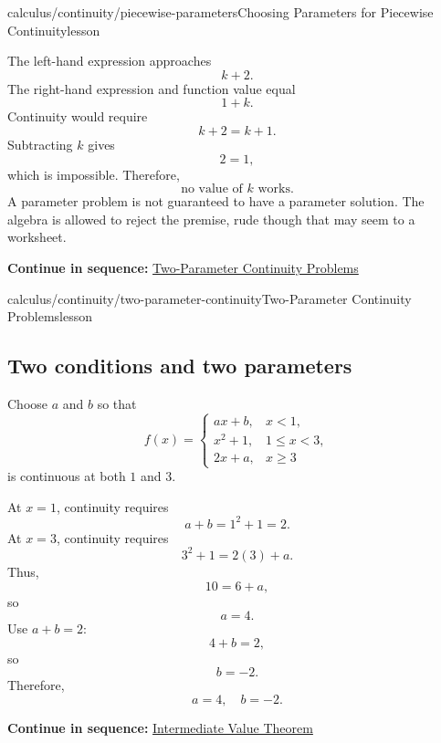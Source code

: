 \documentclass[11pt,openany]{book}
\theoremstyle{bgplain}
\newcounter{bgexample}[chapter]
\newcommand{\webnext}[2]{%
  \par\addvspace{1.2em}\noindent{\color{BGLine}\rule{\textwidth}{0.35pt}}\par\smallskip
  {\small\color{BGGray}\textbf{Continue in sequence:} \hyperlink{web:#1}{#2}}\par
}
\begin{document}
\begin{webpage}{calculus/continuity/piecewise-parameters}{Choosing Parameters for Piecewise Continuity}{lesson}
\begin{bgexample}[title={Exam-level: no parameter works}]
\begin{bgsolution}
The left-hand expression approaches
\[
  k+2.
\]
The right-hand expression and function value equal
\[
  1+k.
\]
Continuity would require
\[
  k+2=k+1.
\]
Subtracting \(k\) gives
\[
  2=1,
\]
which is impossible. Therefore,
\[
  \boxed{\text{no value of }k\text{ works}}.
\]
A parameter problem is not guaranteed to have a parameter solution. The algebra is allowed to reject the premise, rude though that may seem to a worksheet.
\end{bgsolution}
\end{bgexample}
\webnext{calculus/continuity/two-parameter-continuity}{Two-Parameter Continuity Problems}
\end{webpage}

\begin{webpage}{calculus/continuity/two-parameter-continuity}{Two-Parameter Continuity Problems}{lesson}
\subsection{Two conditions and two parameters}

\begin{bgexample}[title={Solve a two-parameter continuity system}]
Choose \(a\) and \(b\) so that
\[
  f(x)=
  \begin{cases}
    ax+b,&x<1,\\
    x^2+1,&1\le x<3,\\
    2x+a,&x\ge3
  \end{cases}
\]
is continuous at both \(1\) and \(3\).

\begin{bgsolution}
At \(x=1\), continuity requires
\[
  a+b=1^2+1=2.
\]
At \(x=3\), continuity requires
\[
  3^2+1=2(3)+a.
\]
Thus,
\[
  10=6+a,
\]
so
\[
  a=4.
\]
Use \(a+b=2\):
\[
  4+b=2,
\]
so
\[
  b=-2.
\]
Therefore,
\[
  \boxed{a=4,\quad b=-2}.
\]
\end{bgsolution}
\end{bgexample}
\webnext{calculus/continuity/intermediate-value-theorem}{Intermediate Value Theorem}
\end{webpage}
\end{document}
